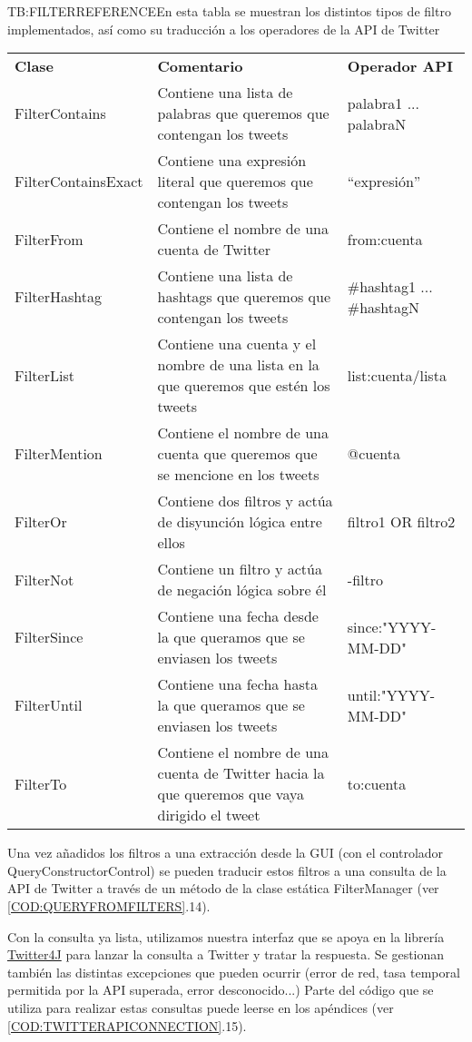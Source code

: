 \begin{table} [Referencia de Filtros Disponibles]{TB:FILTERREFERENCE}{En esta tabla se muestran los distintos tipos de filtro implementados, así como su traducción a los operadores de la API de Twitter}
	\begin{tabular}{|p{3.2cm}|p{8cm}|p{4 cm}|}
		\hline
		\textbf{Clase} & \textbf{Comentario} &\textbf{Operador API}   \\
		FilterContains & Contiene una lista de palabras que queremos que contengan los tweets & palabra1 ... palabraN  \\
		FilterContainsExact & Contiene una expresión literal que queremos que contengan los tweets & ``expresión''\\
		FilterFrom & Contiene el nombre de una cuenta de Twitter & from:cuenta\\
		FilterHashtag & Contiene una lista de hashtags que queremos que contengan los tweets & \#hashtag1 ... \#hashtagN\\
		FilterList & Contiene una cuenta y el nombre de una lista en la que queremos que estén los tweets & list:cuenta/lista \\
		FilterMention & Contiene el nombre de una cuenta que queremos que se mencione en los tweets & @cuenta\\
		FilterOr & Contiene dos filtros y actúa de disyunción lógica entre ellos & filtro1 OR filtro2 \\
		FilterNot & Contiene un filtro y actúa de negación lógica sobre él & -filtro\\
		FilterSince & Contiene una fecha desde la que queramos que se enviasen los tweets & since:"YYYY-MM-DD"\\
		FilterUntil & Contiene una fecha hasta la que queramos que se enviasen los tweets & until:"YYYY-MM-DD"\\
		FilterTo & Contiene el nombre de una cuenta de Twitter hacia la que queremos que vaya dirigido el tweet & to:cuenta\\
		\hline \hline
		\hline
	\end{tabular}
\end{table}


Una vez añadidos los filtros a una extracción desde la GUI (con el controlador QueryConstructorControl) se pueden traducir estos filtros a una consulta de la API de Twitter a través de un método de la clase estática FilterManager (ver \cref{COD:QUERYFROMFILTERS}.14).

Con la consulta ya lista, utilizamos nuestra interfaz que se apoya en la librería \href{http://twitter4j.org/en/}{Twitter4J} para lanzar la consulta a Twitter y tratar la respuesta. Se gestionan también las distintas excepciones que pueden ocurrir (error de red, tasa temporal permitida por la API superada, error desconocido...) Parte del código que se utiliza para realizar estas consultas puede leerse en los apéndices (ver \cref{COD:TWITTERAPICONNECTION}.15).

